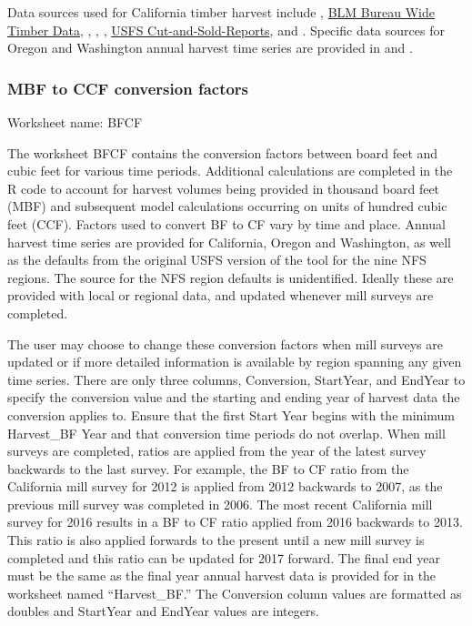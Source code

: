 \documentclass[
  openany]{book}
\begin{document}
Data sources used for California timber harvest include \textcite{bolsinger1976}, \href{https://www.blm.gov/programs/natural-resources/forests-and-woodlands/timber-sales/bureau-wide-timber-data}{BLM Bureau Wide Timber Data}, \textcite{morgan2004}, \textcite{morgan2012}, \textcite{mciver2015}, \href{https://www.fs.fed.us/forestmanagement/products/cut-sold/index.shtml}{USFS Cut-and-Sold-Reports}, and \textcite{warren2005}. Specific data sources for Oregon and Washington annual harvest time series are provided in \textcite{morgan2021} and \textcite{nichols2020}.

\hypertarget{own-prov-input-bfcf}{%
\subsubsection{MBF to CCF conversion factors}\label{own-prov-input-bfcf}}

Worksheet name: BFCF

The worksheet BFCF contains the conversion factors between board feet and cubic feet for various time periods. Additional calculations are completed in the R code to account for harvest volumes being provided in thousand board feet (MBF) and subsequent model calculations occurring on units of hundred cubic feet (CCF). Factors used to convert BF to CF vary by time and place. Annual harvest time series are provided for California, Oregon and Washington, as well as the defaults from the original USFS version of the tool for the nine NFS regions. The source for the NFS region defaults is unidentified. Ideally these are provided with local or regional data, and updated whenever mill surveys are completed.

The user may choose to change these conversion factors when mill surveys are updated or if more detailed information is available by region spanning any given time series. There are only three columns, Conversion, StartYear, and EndYear to specify the conversion value and the starting and ending year of harvest data the conversion applies to. Ensure that the first Start Year begins with the minimum Harvest\_BF Year and that conversion time periods do not overlap. When mill surveys are completed, ratios are applied from the year of the latest survey backwards to the last survey. For example, the BF to CF ratio from the California mill survey for 2012 is applied from 2012 backwards to 2007, as the previous mill survey was completed in 2006. The most recent California mill survey for 2016 results in a BF to CF ratio applied from 2016 backwards to 2013. This ratio is also applied forwards to the present until a new mill survey is completed and this ratio can be updated for 2017 forward. The final end year must be the same as the final year annual harvest data is provided for in the worksheet named ``Harvest\_BF.'' The Conversion column values are formatted as doubles and StartYear and EndYear values are integers.
\end{document}
